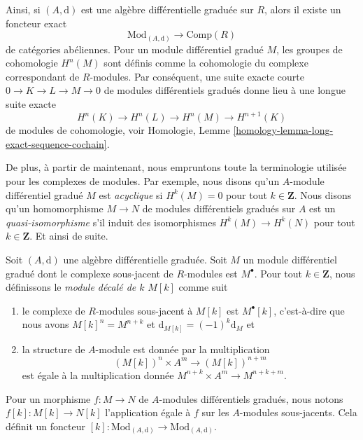 \noindent
Ainsi, si $(A, \text{d})$ est une algèbre différentielle graduée sur $R$, alors il
existe un foncteur exact
$$
\text{Mod}_{(A, \text{d})} \longrightarrow \text{Comp}(R)
$$
de catégories abéliennes. Pour un module différentiel gradué $M$, les groupes de
cohomologie $H^n(M)$ sont définis comme la cohomologie du complexe correspondant
de $R$-modules. Par conséquent, une suite exacte courte $0 \to K \to L \to M \to
0$ de modules différentiels gradués donne lieu à une longue suite exacte
\begin{equation}
\label{equation-les}
H^n(K) \to H^n(L) \to H^n(M) \to H^{n + 1}(K)
\end{equation}
de modules de cohomologie, voir Homologie, Lemme
\ref{homology-lemma-long-exact-sequence-cochain}.

\medskip\noindent
De plus, à partir de maintenant, nous empruntons toute la terminologie utilisée
pour les complexes de modules. Par exemple, nous disons qu'un $A$-module différentiel
gradué $M$ est {\it acyclique} si $H^k(M) = 0$ pour tout $k \in \mathbf{Z}$.
Nous disons qu'un homomorphisme $M \to N$ de modules différentiels gradués sur $A$ est
un {\it quasi-isomorphisme} s'il induit des isomorphismes $H^k(M) \to H^k(N)$ pour
tout $k \in \mathbf{Z}$. Et ainsi de suite.

\begin{definition}
\label{definition-shift}
Soit $(A, \text{d})$ une algèbre différentielle graduée. Soit $M$ un module
différentiel gradué dont le complexe sous-jacent de $R$-modules est $M^\bullet$.
Pour tout $k \in \mathbf{Z}$, nous définissons le {\it module décalé de $k$} $M[k]$
comme suit
\begin{enumerate}
\item le complexe de $R$-modules sous-jacent à $M[k]$ est $M^\bullet[k]$,
c'est-à-dire que nous avons $M[k]^n = M^{n + k}$ et $\text{d}_{M[k]} =
(-1)^k\text{d}_M$ et
\item la structure de $A$-module est donnée par la multiplication
$$
(M[k])^n \times A^m \longrightarrow (M[k])^{n + m}
$$
est égale à la multiplication donnée $M^{n + k} \times A^m \to M^{n + k + m}$.
\end{enumerate}
Pour un morphisme $f : M \to N$ de $A$-modules différentiels gradués, nous notons
$f[k] : M[k] \to N[k]$ l'application égale à $f$ sur les $A$-modules sous-jacents.
Cela définit un foncteur $[k] : \text{Mod}_{(A, \text{d})} \to \text{Mod}_{(A,
\text{d})}$.
\end{definition}

